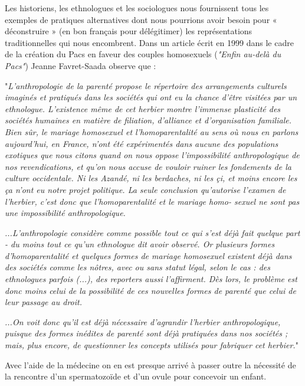  Les historiens, les ethnologues et les sociologues nous fournissent tous les exemples de pratiques alternatives dont nous pourrions avoir besoin pour « déconstruire » (en bon français pour délégitimer) les représentations traditionnelles qui nous encombrent. Dans un article écrit en 1999 dans le cadre de la création du Pacs en faveur des couples homosexuels (\emph{"Enfin au-delà du Pacs"}) Jeanne Favret-Saada observe que :
  \begin{displayquote}
  "\emph{L'anthropologie  de  la  parenté  propose  le  répertoire
des arrangements culturels imaginés et pratiqués dans
les sociétés qui ont eu la chance d'être visitées par un
ethnologue. L'existence  même  de  cet  herbier  montre
l'immense  plasticité  des  sociétés  humaines  en  matière
de filiation, d'alliance et d'organisation familiale. Bien sûr,
le mariage homosexuel et l'homoparentalité au sens où
nous en parlons aujourd'hui, en France, n'ont été expérimentés  dans  aucune  des  populations  exotiques  que
nous  citons  quand  on  nous  oppose  l'impossibilité
anthropologique de nos revendications, et qu'on nous
accuse  de  vouloir  ruiner  les  fondements  de  la  culture
occidentale. Ni les Azandé, ni les berdaches, ni les çi, et
moins encore les ça n'ont eu notre projet politique.
La  seule  conclusion  qu'autorise  l'examen  de  l'herbier,
c'est donc que l'homoparentalité et le mariage homo-
sexuel  ne  sont  pas  une  impossibilité  anthropologique.}

\emph{...L'anthropologie  considère comme possible tout ce qui s'est déjà fait quelque part - du moins tout ce qu'un ethnologue dit avoir observé. Or  plusieurs  formes  d'homoparentalité  et  quelques
formes de mariage homosexuel existent déjà dans des
sociétés  comme  les  nôtres, avec  ou  sans  statut  légal,
selon  le  cas  : des  ethnologues  parfois (...), des
reporters  aussi  l'affirment. Dès  lors, le  problème  est
donc  moins  celui  de  la  possibilité  de  ces  nouvelles
formes de parenté que celui de leur passage au droit.}

\emph{...On voit donc qu'il est déjà nécessaire d'agrandir l'herbier  anthropologique, puisque  des  formes  inédites  de
parenté  sont  déjà  pratiquées  dans  nos  sociétés ; mais,
plus  encore, de questionner  les  concepts  utilisés  pour
fabriquer cet herbier.}" 
 \end{displayquote}
 




Avec l'aide de la médecine on en est presque arrivé à passer outre la nécessité de la rencontre d'un spermatozoïde et d'un ovule pour concevoir un enfant.

